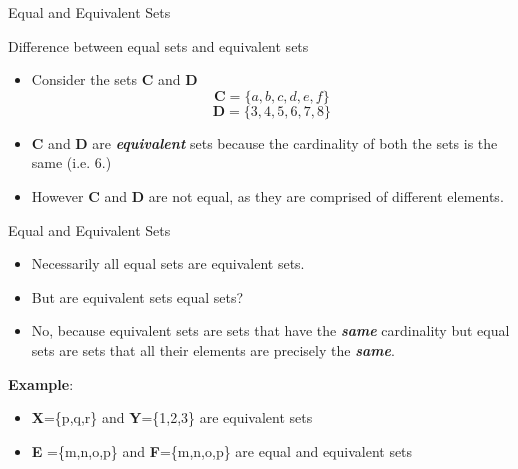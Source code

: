 \documentclass[12pt]{article}
\begin{document}


{Equal and Equivalent Sets}

Difference between equal sets and equivalent sets

\begin{itemize}
	\item Consider the sets \textbf{C} and \textbf{D}
	\[ \boldsymbol{C} = \{a,b,c,d,e,f\} \]  \[ \boldsymbol{D} = \{3,4,5,6,7,8\} \]
	\item \textbf{C} and \textbf{D} are \textit{\textbf{equivalent}} sets
	because the cardinality of both the sets is the same (i.e. 6.)
	\item However \textbf{C} and \textbf{D} are not equal, as they are comprised of different elements.
\end{itemize}








{Equal and Equivalent Sets}


\begin{itemize}
	\item Necessarily all equal sets are equivalent sets.
	\item But are equivalent sets equal sets?
	
	\item No, because equivalent sets are sets that have the \textit{\textbf{same}} cardinality but equal sets are sets that all
	their elements are precisely the \textit{\textbf{same}}. 
\end{itemize}

\textbf{Example}:
\begin{itemize} \item \textbf{X}=\{p,q,r\} and \textbf{Y}=\{1,2,3\} are equivalent sets 
	\item \textbf{E} =\{m,n,o,p\}
	and \textbf{F}=\{m,n,o,p\} are equal and equivalent sets
\end{itemize}
\end{document}
